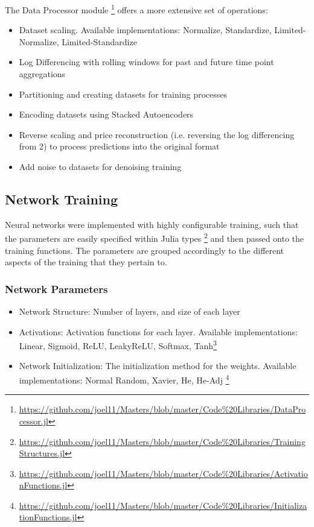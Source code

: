 \documentclass[a4paper,11pt,oneside]{article}
\theoremstyle{plain}
\theoremstyle{definition}
\begin{document}
The Data Processor module \footnote{\url{https://github.com/joel11/Masters/blob/master/Code\%20Libraries/DataProcessor.jl}} offers a more extensive set of operations:
\begin{itemize}
	\item[1] Dataset scaling. Available implementations: Normalize, Standardize, Limited-Normalize, Limited-Standardize	
	\item[2] Log Differencing with rolling windows for past and future time point aggregations
	\item[3] Partitioning and creating datasets for training processes
	\item[4] Encoding datasets using Stacked Autoencoders
	\item[5] Reverse scaling and price reconstruction (i.e. reversing the log differencing from 2) to process predictions into the original format
	\item[6] Add noise to datasets for denoising training
\end{itemize}

\subsection{Network Training}

Neural networks were implemented with highly configurable training, such that the parameters are easily specified within Julia types \footnote{\url{https://github.com/joel11/Masters/blob/master/Code\%20Libraries/TrainingStructures.jl}} and then passed onto the training functions. The parameters are grouped accordingly to the different aspects of the training that they pertain to.

\subsubsection{Network Parameters}
\begin{itemize}
	\item[1] Network Structure: Number of layers, and size of each layer
	\item[2] Activations: Activation functions for each layer. Available implementations: Linear, Sigmoid, ReLU, LeakyReLU, Softmax, Tanh\footnote{\url{https://github.com/joel11/Masters/blob/master/Code\%20Libraries/ActivationFunctions.jl}}
	\item[3] Network Initialization: The initialization method for the weights. Available implementations: Normal Random, Xavier, He, He-Adj \footnote{\url{https://github.com/joel11/Masters/blob/master/Code\%20Libraries/InitializationFunctions.jl}}
\end{itemize}
\end{document}
